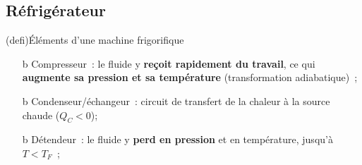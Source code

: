 \documentclass[../../main/main.tex]{subfiles}
\begin{document}
\subsection{Réfrigérateur}
\begin{tcb}(defi){Éléments d'une machine frigorifique}
	\begin{isd}
		\begin{enumerate}
			\item[b]{Compresseur}~: le fluide y \textbf{reçoit rapidement du
				travail}, ce qui \textbf{augmente sa pression et sa température}
			(transformation adiabatique)~;

			\item[b]{Condenseur/échangeur}~: circuit de transfert de la chaleur à
			la source chaude ($Q_C < 0$);
		\end{enumerate}
		\tcblower
		\begin{enumerate}[start=3]
			\item[b]{Détendeur}~: le fluide y \textbf{perd en pression} et en
			température, jusqu'à $T < T_F$~;


\end{enumerate}
\end{isd}
\end{tcb}
\end{document}
